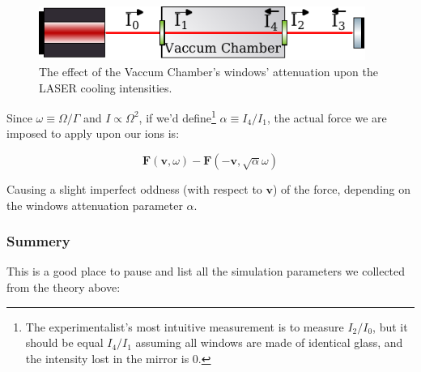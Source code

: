 \begin{figure}[h!]
	\begin{center}
		\includegraphics[width=0.95\textwidth]{graphics/windows-attenuation.pdf}
	\end{center}
	\caption{The effect of the Vaccum Chamber's windows' attenuation upon the LASER cooling intensities.}\label{fig:windows-attenuation}
\end{figure}

Since $\omega \equiv \Omega/\Gamma$ and $I \propto \Omega^2$, if we'd define\footnote{The experimentalist's most intuitive measurement is to measure $I_2/I_0$, but it should be equal $I_4/I_1$ assuming all windows are made of identical glass, and the intensity lost in the mirror is 0.} $\alpha \equiv I_4/I_1$, the actual force we are imposed to apply upon our ions is:

\begin{equation}
	\mathbf{F}(\mathbf{v}, \omega) - \mathbf{F}(-\mathbf{v}, \sqrt{\alpha}\omega)
\end{equation}

Causing a slight imperfect oddness (with respect to $\mathbf{v}$) of the force, depending on the windows attenuation parameter $\alpha$.

\subsubsection{Summery}

This is a good place to pause and list all the simulation parameters we collected from the theory above:

